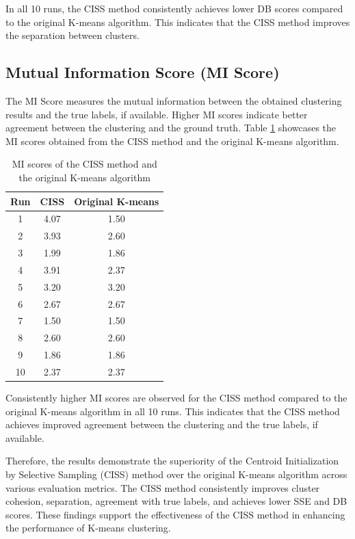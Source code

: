 \documentclass[10pt,twocolumn,a4paper]{article}
\begin{document}
In all 10 runs, the CISS method consistently achieves lower DB scores compared to the original K-means algorithm. This indicates that the CISS method improves the separation between clusters.

\subsection{Mutual Information Score (MI Score)}

The MI Score measures the mutual information between the obtained clustering results and the true labels, if available. Higher MI scores indicate better agreement between the clustering and the ground truth. Table \ref{table:mi} showcases the MI scores obtained from the CISS method and the original K-means algorithm.

\begin{table}[ht]
  \centering
  \caption{MI scores of the CISS method and the original K-means algorithm}
  \label{table:mi}
  \begin{tabular}{ccc}
    \hline
    Run & CISS & Original K-means \\
    \hline
    1   & 4.07 & 1.50 \\
    2   & 3.93 & 2.60 \\
    3   & 1.99 & 1.86 \\
    4   & 3.91 & 2.37 \\
    5   & 3.20 & 3.20 \\
    6   & 2.67 & 2.67 \\
    7   & 1.50 & 1.50 \\
    8   & 2.60 & 2.60 \\
    9   & 1.86 & 1.86 \\
    10  & 2.37 & 2.37 \\
    \hline
  \end{tabular}
\end{table}

Consistently higher MI scores are observed for the CISS method compared to the original K-means algorithm in all 10 runs. This indicates that the CISS method achieves improved agreement between the clustering and the true labels, if available.

 Therefore, the results demonstrate the superiority of the Centroid Initialization by Selective Sampling (CISS) method over the original K-means algorithm across various evaluation metrics. The CISS method consistently improves cluster cohesion, separation, agreement with true labels, and achieves lower SSE and DB scores. These findings support the effectiveness of the CISS method in enhancing the performance of K-means clustering.
\end{document}
